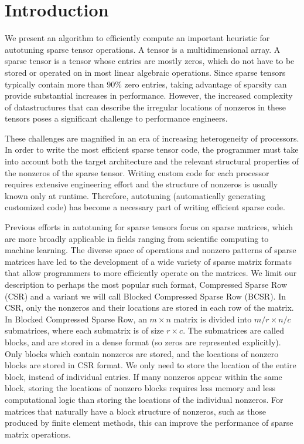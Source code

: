\section{Introduction}

  We present an algorithm to efficiently compute an important heuristic for autotuning sparse tensor operations. A tensor is a multidimensional array. A sparse tensor is a tensor whose entries are mostly zeros, which do not have to be stored or operated on in most linear algebraic operations. Since sparse tensors typically contain more than 90\% zero entries, taking advantage of sparsity can provide substantial increases in performance. However, the increased complexity of datastructures that can describe the irregular locations of nonzeros in these tensors poses a significant challenge to performance engineers.

  These challenges are magnified in an era of increasing heterogeneity of processors. In order to write the most efficient sparse tensor code, the programmer must take into account both the target architecture and the relevant structural properties of the nonzeros of the sparse tensor. Writing custom code for each processor requires extensive engineering effort and the structure of nonzeros is usually known only at runtime. Therefore, autotuning (automatically generating customized code) has become a necessary part of writing efficient sparse code.

  Previous efforts in autotuning for sparse tensors focus on sparse matrices, which are more broadly applicable in fields ranging from scientific computing to machine learning. The diverse space of operations and nonzero patterns of sparse matrices have led to the development of a wide variety of sparse matrix formats that allow programmers to more efficiently operate on the matrices. We limit our description to perhaps the most popular such format, Compressed Sparse Row (CSR) and a variant we will call Blocked Compressed Sparse Row (BCSR). In CSR, only the nonzeros and their locations are stored in each row of the matrix. In Blocked Compressed Sparse Row, an $m \times n$ matrix is divided into $m/r \times n/c$ submatrices, where each submatrix is of size $r \times c$. The submatrices are called blocks, and are stored in a dense format (so zeros are represented explicitly). Only blocks which contain nonzeros are stored, and the locations of nonzero blocks are stored in CSR format. We only need to store the location of the entire block, instead of individual entries. If many nonzeros appear within the same block, storing the locations of nonzero blocks requires less memory and less computational logic than storing the locations of the individual nonzeros. For matrices that naturally have a block structure of nonzeros, such as those produced by finite element methods, this can improve the performance of sparse matrix operations.

